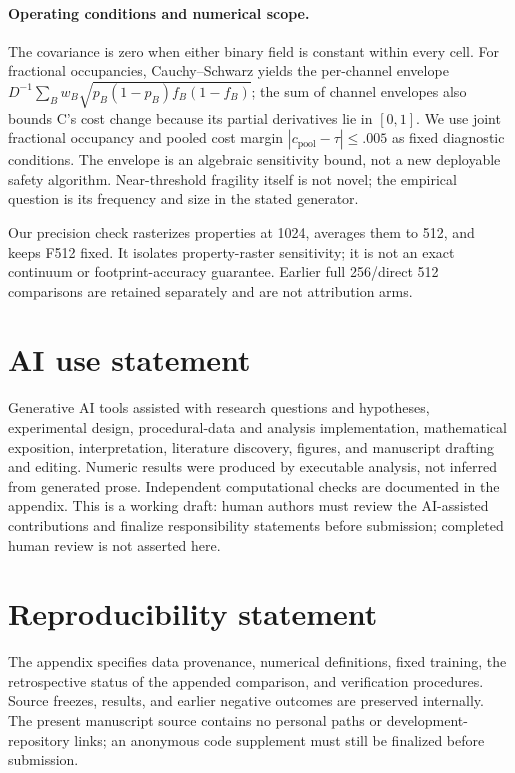\documentclass{article}
\newcommand{\poolcost}{c_{\mathrm{pool}}}
\begin{document}
\paragraph{Operating conditions and numerical scope.}
The covariance is zero when either binary field is constant within every cell.
For fractional occupancies, Cauchy--Schwarz yields the per-channel envelope
$D^{-1}\sum_Bw_B\sqrt{p_B(1-p_B)f_B(1-f_B)}$; the sum of channel envelopes also
bounds C's cost change because its partial derivatives lie in $[0,1]$.
We use joint fractional occupancy and pooled cost margin $|\poolcost-\tau|\leq .005$
as fixed diagnostic conditions. The envelope is an algebraic sensitivity bound,
not a new deployable safety algorithm. Near-threshold fragility itself is not
novel; the empirical question is its frequency and size in the stated generator.

Our precision check rasterizes properties at 1024, averages them to 512, and keeps
F512 fixed. It isolates property-raster sensitivity; it is not an exact continuum
or footprint-accuracy guarantee. Earlier full 256/direct 512 comparisons are
retained separately and are not attribution arms.




\label{maintextend}
\clearpage
{}
\section*{AI use statement}
Generative AI tools assisted with research questions and hypotheses, experimental
design, procedural-data and analysis implementation, mathematical exposition,
interpretation, literature discovery, figures, and manuscript drafting and editing.
Numeric results were produced by executable analysis, not inferred from generated
prose. Independent computational checks are documented in the appendix. This is
a working draft: human authors must review the AI-assisted contributions and
finalize responsibility statements before submission; completed human review is
not asserted here.
\section*{Reproducibility statement}
The appendix specifies data provenance, numerical definitions, fixed training,
the retrospective status of the appended comparison, and verification procedures.
Source freezes, results, and earlier negative outcomes are preserved internally.
The present manuscript source contains no personal paths or development-repository
links; an anonymous code supplement must still be finalized before submission.


\clearpage
\appendix

\end{document}
